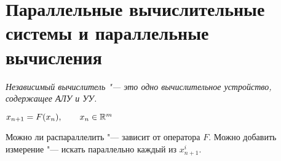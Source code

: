 \section{Параллельные вычислительные системы и параллельные \tpst\\{}вычисления}

\begin{definition}
	\it{Независимый вычислитель} "--- это одно вычислительное устройство, содержащее АЛУ и УУ.
\end{definition}


$ x_{n + 1} = F(x_n), \qquad x_n \in \mathbb{R}^m $

Можно ли распараллелить "--- зависит от оператора $ F $. Можно добавить измерение "--- искать параллельно каждый из $ x_{n + 1}^i $.
